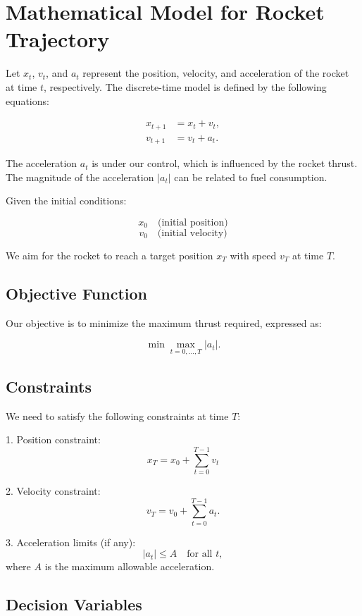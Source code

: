 \documentclass{article}
\begin{document}
\section*{Mathematical Model for Rocket Trajectory}

Let \( x_t \), \( v_t \), and \( a_t \) represent the position, velocity, and acceleration of the rocket at time \( t \), respectively. The discrete-time model is defined by the following equations:

\begin{align}
x_{t+1} &= x_t + v_t, \tag{1} \\
v_{t+1} &= v_t + a_t. \tag{2}
\end{align}

The acceleration \( a_t \) is under our control, which is influenced by the rocket thrust. The magnitude of the acceleration \( |a_t| \) can be related to fuel consumption.

Given the initial conditions:

\[
x_0 \quad \text{(initial position)}
\]
\[
v_0 \quad \text{(initial velocity)}
\]

We aim for the rocket to reach a target position \( x_T \) with speed \( v_T \) at time \( T \).

\subsection*{Objective Function}

Our objective is to minimize the maximum thrust required, expressed as:

\[
\min \max_{t = 0, \ldots, T} |a_t|. \tag{3}
\]

\subsection*{Constraints}

We need to satisfy the following constraints at time \( T \):

1. Position constraint:
\[
x_T = x_0 + \sum_{t=0}^{T-1} v_t \tag{4}
\]

2. Velocity constraint:
\[
v_T = v_0 + \sum_{t=0}^{T-1} a_t. \tag{5}
\]

3. Acceleration limits (if any):
\[
|a_t| \leq A \quad \text{for all } t, \tag{6}
\]
where \( A \) is the maximum allowable acceleration.

\subsection*{Decision Variables}
\end{document}

